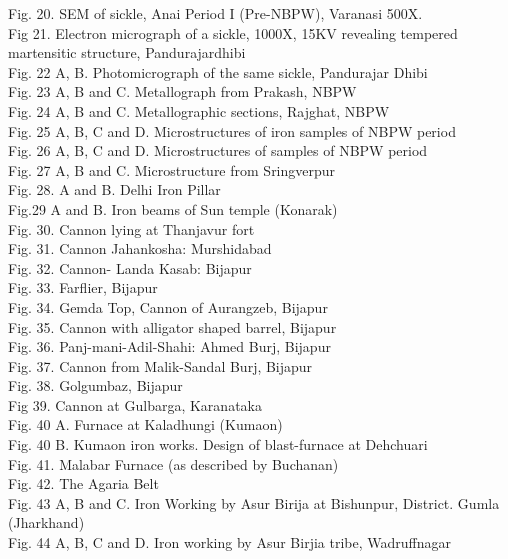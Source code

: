 \begin{myquote}
Fig. 20.  SEM of sickle, Anai Period I (Pre-NBPW), Varanasi 500X.\\[.2cm]
Fig 21.  Electron micrograph of a sickle, 1000X, 15KV revealing tempered martensitic structure, Pandurajardhibi \\[.2cm]
Fig. 22 A, B.  Photomicrograph of the same sickle, Pandurajar Dhibi \\[.2cm]
Fig. 23 A, B and C. Metallograph from Prakash, NBPW  \\[.2cm]
Fig. 24 A, B and C.  Metallographic sections, Rajghat, NBPW\\[.2cm]
Fig. 25 A, B, C and D.  Microstructures of iron samples of NBPW period \\[.2cm]
Fig. 26 A, B, C and D.   Microstructures of samples of NBPW period \\[.2cm]
Fig. 27 A, B and C.  Microstructure from Sringverpur \\[.2cm]
Fig. 28. A and B.  Delhi Iron Pillar \\[.2cm]
Fig.29 A and B.  Iron beams of  Sun temple  (Konarak)\\[.2cm]
Fig. 30.  Cannon lying at Thanjavur fort  \\[.2cm]
Fig. 31.  Cannon Jahankosha: Murshidabad \\[.2cm]
Fig. 32.  Cannon- Landa Kasab: Bijapur \\[.2cm]
Fig. 33.  Farflier, Bijapur \\[.2cm]
Fig. 34.  Gemda Top, Cannon of Aurangzeb, Bijapur \\[.2cm]
Fig. 35.  Cannon with alligator shaped barrel, Bijapur \\[.2cm]
Fig. 36.  Panj-mani-Adil-Shahi: Ahmed Burj, Bijapur \\[.2cm]
Fig. 37.  Cannon from Malik-Sandal Burj, Bijapur \\[.2cm]
Fig. 38.  Golgumbaz, Bijapur \\[.2cm]
Fig 39.  Cannon at Gulbarga, Karanataka \\[.2cm]
Fig. 40 A.  Furnace at Kaladhungi (Kumaon)\\[.2cm]
Fig. 40 B.  Kumaon iron works. Design of blast-furnace at Dehchuari \\[.2cm]
Fig. 41.  Malabar Furnace (as described by Buchanan)\\[.2cm]
Fig. 42.   The Agaria Belt \\[.2cm]
Fig. 43 A, B and C.  Iron Working by Asur Birija at Bishunpur, District. Gumla (Jharkhand) \\[.2cm]
Fig. 44 A, B, C and D.  Iron working by Asur Birjia tribe, Wadruffnagar \\[.2cm]

\end{myquote}
